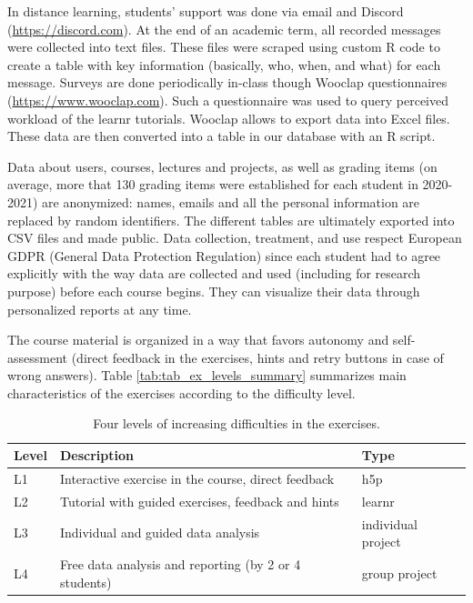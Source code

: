 \documentclass{aims}
\theoremstyle{definition}
\begin{document}
In distance learning, students' support was done via email and Discord
(\url{https://discord.com}). At the end of an academic term, all
recorded messages were collected into text files. These files were
scraped using custom R code to create a table with key information
(basically, who, when, and what) for each message. Surveys are done
periodically in-class though Wooclap questionnaires
(\url{https://www.wooclap.com}). Such a questionnaire was used to query
perceived workload of the learnr tutorials. Wooclap allows to export
data into Excel files. These data are then converted into a table in our
database with an R script.

Data about users, courses, lectures and projects, as well as grading
items (on average, more that 130 grading items were established for each
student in 2020-2021) are anonymized: names, emails and all the personal
information are replaced by random identifiers. The different tables are
ultimately exported into CSV files and made public. Data collection,
treatment, and use respect European GDPR (General Data Protection
Regulation) since each student had to agree explicitly with the way data
are collected and used (including for research purpose) before each
course begins. They can visualize their data through personalized
reports at any time.

The course material is organized in a way that favors autonomy and
self-assessment (direct feedback in the exercises, hints and retry
buttons in case of wrong answers). Table
\ref {tab:tab_ex_levels_summary} summarizes main characteristics of the
exercises according to the difficulty level.

\begin{table}

\caption{\label{tab:tab_ex_levels_summary}\label{tab:tab_ex_levels} Four levels of increasing difficulties in the exercises.}
\centering
\begin{tabular}[t]{l|l|l}
\hline
Level & Description & Type\\
\hline
L1 & Interactive exercise in the course, direct feedback & h5p\\
\hline
L2 & Tutorial with guided exercises, feedback and hints & learnr\\
\hline
L3 & Individual and guided data analysis & individual project\\
\hline
L4 & Free data analysis and reporting (by 2 or 4 students) & group project\\
\hline
\end{tabular}
\end{table}
\end{document}
